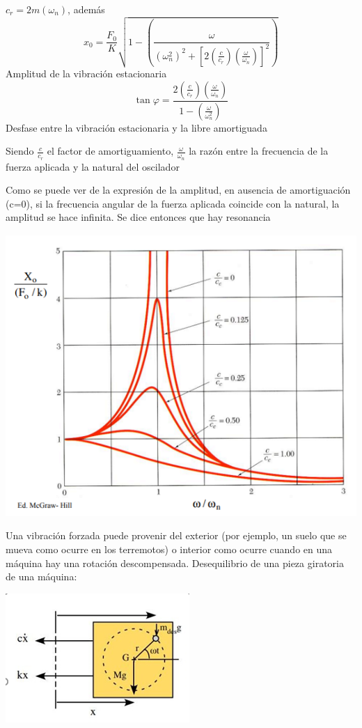 \documentclass[oneside,12pt]{report}
\begin{document}
$c_r=2m (\omega_n)$, además 
\begin{equation}
	x_0=\frac{F_0}{K}\sqrt{1-\left( \frac{\omega}{(\omega_n^{2})^{2}+[2(\frac{c}{c_r})(\frac{\omega}{\omega_n})]^{2}}\right) }
\end{equation}
Amplitud de la vibración estacionaria
\begin{equation}
	\tan \varphi=\frac{2(\frac{c}{c_r})(\frac{\omega}{\omega_n})}{1-\left( \frac{\omega}{\omega_n^{2}}\right) }
\end{equation}
Desfase entre la vibración estacionaria y la libre
amortiguada

Siendo $\frac{c}{c_r}$ el factor de amortiguamiento, $\frac{\omega}{\omega_n}$ la razón entre la frecuencia de la fuerza aplicada y la natural del oscilador


Como se puede ver de la expresión de la amplitud, en ausencia de amortiguación (c=0),
si la frecuencia angular de la fuerza aplicada coincide con la natural, la amplitud se
hace infinita. Se dice entonces que hay resonancia

\begin{center}
	\includegraphics[width=0.8\linewidth]{imagen6}
\end{center}
Una vibración forzada puede provenir del exterior (por ejemplo, un suelo que se mueva
como ocurre en los terremotos) o interior como ocurre cuando en una máquina hay una
rotación descompensada.
Desequilibrio de una pieza giratoria de una máquina:

\begin{center}
	\includegraphics[width=0.5\linewidth]{imagen5}
\end{center}
\end{document}
